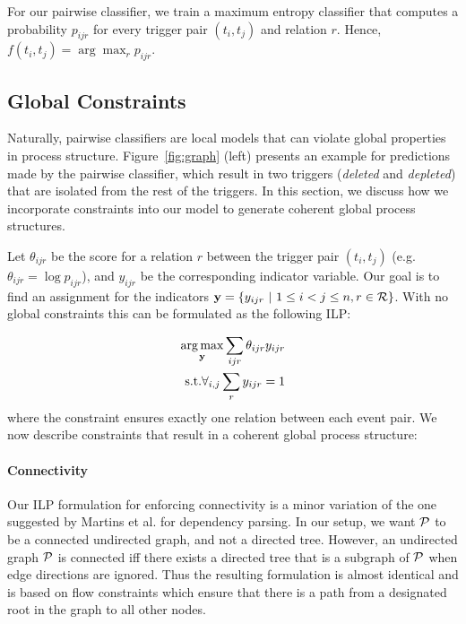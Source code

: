 For our pairwise classifier, we train a maximum entropy classifier that computes a probability $p_{ijr}$ for every trigger pair $(t_i,t_j)$ and relation $r$. Hence, $f(t_i,t_j)= \arg\max_r p_{ijr}$.

\subsection{Global Constraints} \label{subsec:global}
Naturally, pairwise classifiers are local models that can violate global properties in process structure. Figure~\ref{fig:graph} (left) presents an example for predictions made by the pairwise classifier, which result in two triggers (\emph{deleted} and \emph{depleted}) that are isolated from the rest of the triggers. In this section, we discuss how we incorporate constraints into our model to generate coherent global process structures.

Let $\theta_{ijr}$ be the score for a relation $r$ between the trigger pair $(t_i,t_j)$ (e.g. $\theta_{ijr}=\log p_{ijr}$), and $y_{ijr}$ be the corresponding indicator variable. Our goal is to find an assignment for the indicators $\by=\{y_{ijr} \ | \ 1 \leq i < j \leq n, r \in \sR \}$. With no global constraints this can be formulated as the following ILP:

\begin{align}
\vspace{-3mm}
\argmax_{\by} \sum_{ijr} \theta_{ijr} y_{ijr} \\
\mbox{s.t.} \forall_{i,j} \sum_r y_{ijr}=1 \nonumber
\vspace{-3mm}
\end{align}
\noindent where the constraint ensures exactly one relation between each event pair. We now describe constraints that result in a coherent global process structure:

\paragraph{Connectivity} 
Our ILP formulation for enforcing connectivity is a minor variation of the one suggested by Martins et al.  for dependency parsing. In our setup, we want $\mathcal{P}$ to be a connected undirected graph, and not a directed tree. However, an undirected graph $\mathcal{P}$ is connected iff there exists a directed tree that is a subgraph of $\mathcal{P}$ when edge directions are ignored. Thus the resulting formulation is almost identical and is based on flow constraints which ensure that there is a path from a designated root in the graph to all other nodes.

